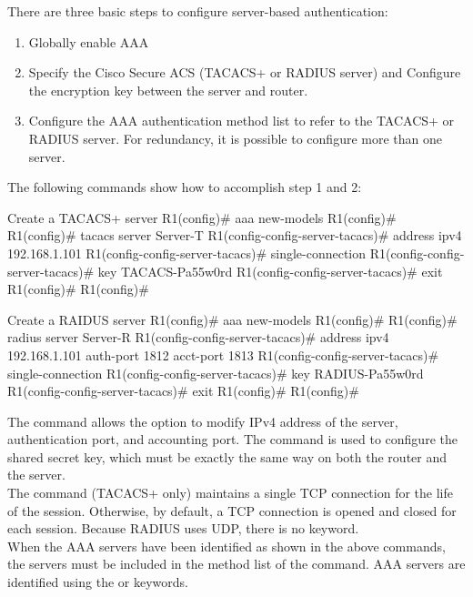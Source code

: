 There are three basic steps to configure server-based authentication:

\begin{enumerate}
\item Globally enable AAA
\item Specify the Cisco Secure ACS (TACACS+ or RADIUS server) and Configure the encryption key between the server and router.
\item Configure the AAA authentication method list to refer to the TACACS+ or RADIUS server. For redundancy, it is possible to configure more than one server.
\end{enumerate}

The following commands show how to accomplish step 1 and 2:

\begin{sexylisting}{Create a TACACS+ server}
R1(config)# aaa new-models
R1(config)# 
R1(config)# tacacs server Server-T
R1(config-config-server-tacacs)# address ipv4 192.168.1.101
R1(config-config-server-tacacs)# single-connection
R1(config-config-server-tacacs)# key TACACS-Pa55w0rd
R1(config-config-server-tacacs)# exit
R1(config)# 
R1(config)# 
\end{sexylisting}

\begin{sexylisting}{Create a RAIDUS server}
R1(config)# aaa new-models
R1(config)# 
R1(config)# radius server Server-R
R1(config-config-server-tacacs)# address ipv4 192.168.1.101 auth-port 1812 acct-port 1813
R1(config-config-server-tacacs)# single-connection
R1(config-config-server-tacacs)# key RADIUS-Pa55w0rd
R1(config-config-server-tacacs)# exit
R1(config)# 
R1(config)# 
\end{sexylisting}

The  command allows the option to modify IPv4 address of the server, authentication port, and accounting port. The  command is used to configure the shared secret key, which must be exactly the same way on both the router and the server.\\

The  command (TACACS+ only) maintains a single TCP connection for the life of the session. Otherwise, by default, a TCP connection is opened and closed for each session. Because RADIUS uses UDP, there is no  keyword.\\

When the AAA servers have been identified as shown in the above commands, the servers must be included in the method list of the  command. AAA servers are identified using the  or  keywords. 

